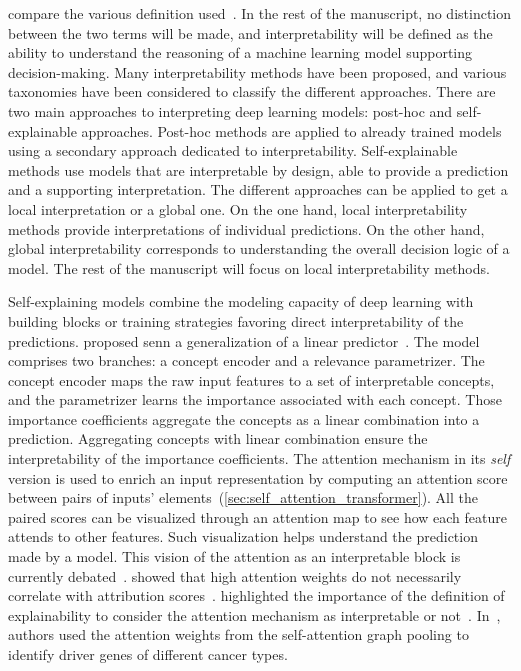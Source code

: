 \documentclass[../main.tex]{subfiles}
\begin{document}
	\citeauthor{clinciu-hastie-2019-survey} compare the various definition used~\cite{clinciu-hastie-2019-survey}.
	In the rest of the manuscript, no distinction between the two terms will be made, and interpretability will be defined as the ability to understand the reasoning of a machine learning model supporting decision-making.
	Many interpretability methods have been proposed, and various taxonomies have been considered to classify the different approaches.
	There are two main approaches to interpreting deep learning models: post-hoc and self-explainable approaches.
	Post-hoc methods are applied to already trained models using a secondary approach dedicated to interpretability.
	Self-explainable methods use models that are interpretable by design, \ie{}able to provide a prediction and a supporting interpretation.
	The different approaches can be applied to get a local interpretation or a global one.
	On the one hand, local interpretability methods provide interpretations of individual predictions.
	On the other hand, global interpretability corresponds to understanding the overall decision logic of a model.
	The rest of the manuscript will focus on local interpretability methods.

	Self-explaining models combine the modeling capacity of deep learning with building blocks or training strategies favoring direct interpretability of the predictions.
	\citeauthor{SENN} proposed \gls{senn} a generalization of a linear predictor~\cite{SENN}.
	The model comprises two branches: a concept encoder and a relevance parametrizer.
	The concept encoder maps the raw input features to a set of interpretable concepts, and the parametrizer learns the importance associated with each concept.
	Those importance coefficients aggregate the concepts as a linear combination into a prediction.
	Aggregating concepts with linear combination ensure the interpretability of the importance coefficients.
	The attention mechanism in its \textit{self} version is used to enrich an input representation by computing an attention score between pairs of inputs' elements~(\cref{sec:self_attention_transformer}).
	All the paired scores can be visualized through an attention map to see how each feature attends to other features.
	Such visualization helps understand the prediction made by a model.
	This vision of the attention as an interpretable block is currently debated~\cite{jain-wallace-2019-attention,wiegreffe-pinter-2019-attention}.
	\citeauthor{jain-wallace-2019-attention} showed that high attention weights do not necessarily correlate with attribution scores~\cite{jain-wallace-2019-attention}.
	\citeauthor{wiegreffe-pinter-2019-attention} highlighted the importance of the definition of explainability to consider the attention mechanism as interpretable or not~\citeauthor{wiegreffe-pinter-2019-attention}.
	In~\cite{DeepMOCCA}, authors used the attention weights from the self-attention graph pooling to identify driver genes of different cancer types.
\end{document}
